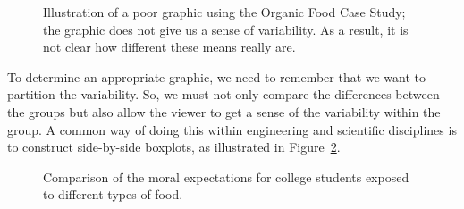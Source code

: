 \documentclass[
  letterpaper,
  DIV=11,
  numbers=noendperiod]{scrreprt}
\theoremstyle{definition}
\theoremstyle{definition}
\theoremstyle{plain}
\theoremstyle{remark}
\begin{document}
\begin{figure}


\caption{\label{fig-anovasummaries-bad-bar}Illustration of a poor
graphic using the Organic Food Case Study; the graphic does not give us
a sense of variability. As a result, it is not clear how different these
means really are.}

\end{figure}%

To determine an appropriate graphic, we need to remember that we want to
partition the variability. So, we must not only compare the differences
between the groups but also allow the viewer to get a sense of the
variability within the group. A common way of doing this within
engineering and scientific disciplines is to construct side-by-side
boxplots, as illustrated in
Figure~\ref{fig-anovasummaries-organic-boxplot}.

\begin{figure}


\caption{\label{fig-anovasummaries-organic-boxplot}Comparison of the
moral expectations for college students exposed to different types of
food.}

\end{figure}%
\end{document}
